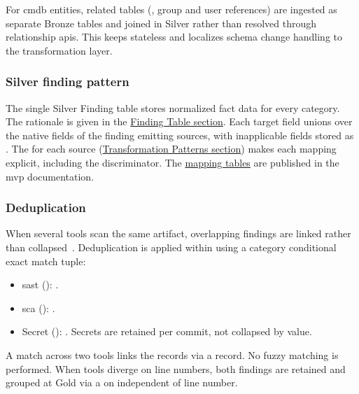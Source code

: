 For \gls{cmdb} entities, related tables (, group and user references) are ingested as separate Bronze tables and joined in Silver rather than resolved through relationship \glspl{api}. This keeps  stateless and localizes schema change handling to the transformation layer.

\subsubsection{Silver finding pattern}

The single Silver Finding table  stores normalized fact data for every category. The rationale is given in the \hyperref[sec:silver-findings-design]{Finding Table section}. Each target field unions over the native fields of the finding emitting sources, with inapplicable fields stored as . The  for each source (\hyperref[sec:transformation-patterns]{Transformation Patterns section}) makes each mapping explicit, including the  discriminator. The \href{https://vkraus.github.io/appsec-mvp/platform/reference/canonical-mapping/\#silver-finding-mapping-requirements}{mapping tables} are published in the \gls{mvp} documentation.

\subsubsection{Deduplication}

When several tools scan the same artifact, overlapping findings are linked rather than collapsed~\parencite{Reis2022}. Deduplication is applied within  using a category conditional exact match tuple:

\begin{itemize}
    \item \gls{sast} (): .
    \item \gls{sca} (): .
    \item Secret (): . Secrets are retained per commit, not collapsed by value.
\end{itemize}

A match across two tools links the records via a  record. No fuzzy matching is performed. When tools diverge on line numbers, both findings are retained and grouped at Gold via a  on  independent of line number.

